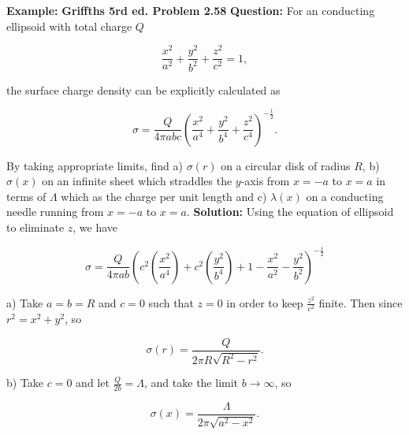 \documentclass[a4paper,12pt]{report}
\begin{document}
	\begin{example_template}
		\textbf{Example:} \textbf{Griffths 5rd ed. Problem 2.58} \newline \newline
		\textbf{Question:} For an conducting ellipsoid with total charge \(Q\)
		
		
		\begin{equation}
			\frac{x^2}{a^2} + \frac{y^2}{b^2} + \frac{z^2}{c^2} =1, 
		\end{equation}
		
		the surface charge density can be explicitly calculated as 
		
		\begin{equation}
			\sigma = \frac{Q}{4\pi abc} (\frac{x^2}{a^4} + \frac{y^2}{b^4} + \frac{z^2}{c^4} )^{-\frac{1}{2} }. 
		\end{equation}
		
		By taking appropriate limits, find  \newline a) \(\sigma (r)\) on a circular disk of radius \(R\), \newline b) \(\sigma (x)\) on an infinite sheet which straddles the \(y\)-axis from \(x = -a \) to \(x = a\) in terms of \(\Lambda \) which as the charge per unit length and \newline c) \(\lambda (x)\) on a conducting needle running from \(x = -a \) to \(x = a\). 
		\newline \newline
		\textbf{Solution:}  Using the equation of ellipsoid to eliminate \(z\), we have
		
		\begin{equation}
			\sigma = \frac{Q}{4\pi ab} (c^2(\frac{x^2}{a^4}) + c^2(\frac{y^2}{b^4} ) + 1 - \frac{x^2}{a^2}  - \frac{y^2}{b^2} )^{-\frac{1}{2} }   
		\end{equation}
		
		a) Take \(a = b = R\) and \(c = 0\) such that \(z = 0\) in order to keep \(\frac{z^2}{c^2} \) finite. Then since \(r^2 = x^2 + y^2\), so 
		
		\begin{equation}
			\sigma (r) = \frac{Q}{2\pi R\sqrt{R^2-r^2} }.
		\end{equation}
		
		b) Take \(c = 0\) and let \(\frac{Q}{2b} = \Lambda \), and take the limit \(b \rightarrow \infty\), so
		
		\begin{equation}
			\sigma (x) = \frac{\Lambda }{2\pi \sqrt{a^2 - x^2} } .
		\end{equation}
		

\end{example_template}
\end{document}
